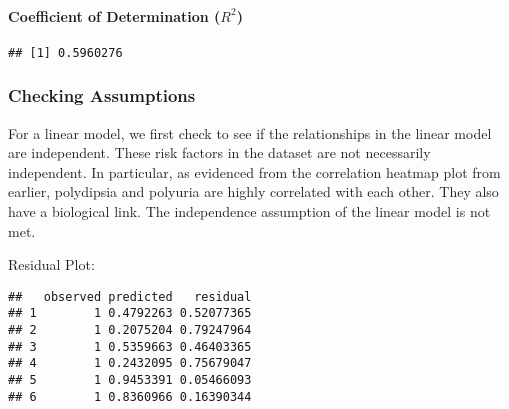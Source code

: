 \documentclass[
]{article}
\newenvironment{Shaded}{}{}
\newcommand{\DataTypeTok}[1]{\textcolor[rgb]{0.56,0.13,0.00}{#1}}
\newcommand{\KeywordTok}[1]{\textcolor[rgb]{0.00,0.44,0.13}{\textbf{#1}}}
\newcommand{\NormalTok}[1]{#1}
\newcommand{\OperatorTok}[1]{\textcolor[rgb]{0.40,0.40,0.40}{#1}}
\newcommand{\StringTok}[1]{\textcolor[rgb]{0.25,0.44,0.63}{#1}}
\begin{document}
\hypertarget{header-n922}{%
\paragraph{\texorpdfstring{Coefficient of Determination
(\(R^2\))}{Coefficient of Determination (R\^{}2)}}\label{header-n922}}

\begin{Shaded}
\end{Shaded}

\begin{verbatim}
## [1] 0.5960276
\end{verbatim}

\hypertarget{header-n925}{%
\subsubsection{Checking Assumptions}\label{header-n925}}

For a linear model, we first check to see if the relationships in the
linear model are independent. These risk factors in the dataset are not
necessarily independent. In particular, as evidenced from the
correlation heatmap plot from earlier, polydipsia and polyuria are
highly correlated with each other. They also have a biological link. The
independence assumption of the linear model is not met.

Residual Plot:

\begin{Shaded}
\end{Shaded}

\begin{verbatim}
##   observed predicted   residual
## 1        1 0.4792263 0.52077365
## 2        1 0.2075204 0.79247964
## 3        1 0.5359663 0.46403365
## 4        1 0.2432095 0.75679047
## 5        1 0.9453391 0.05466093
## 6        1 0.8360966 0.16390344
\end{verbatim}
\end{document}

